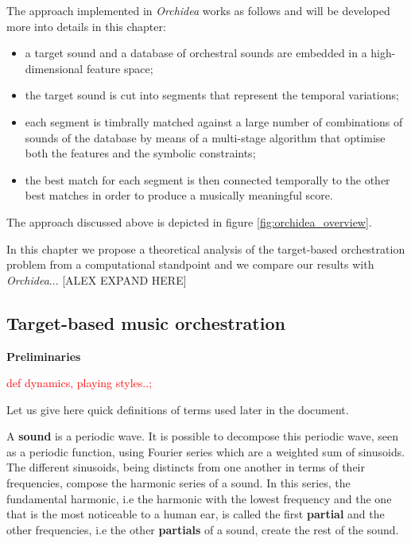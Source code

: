\documentclass[a4paper]{book}
\newcommand{\alex}[2]{\textcolor{red}{#1}}
\begin{document}
 







The approach implemented in \textit{Orchidea} works as follows and will be developed more into details in this chapter:
\begin{itemize}
	\item a target sound and a database of orchestral sounds are embedded in a high-dimensional feature space;
	\item the target sound is cut into segments that represent the temporal variations;
	\item each segment is timbrally matched against a large number of combinations of sounds of the database
	by means of a multi-stage algorithm that optimise both the features and the symbolic constraints;
	\item the best match for each segment is then connected temporally to the other best matches in order to produce a musically meaningful score.
\end{itemize}



The approach discussed above is depicted in figure \ref{fig:orchidea_overview}.

In this chapter we propose a theoretical analysis of the target-based orchestration problem from a computational standpoint and we compare our results with \textit{Orchidea}... [ALEX EXPAND HERE]

\subsection{Target-based music orchestration}
\textbf{Preliminaries}

\alex{def dynamics, playing styles..;}\\

Let us give here quick definitions of terms used later in the document. 

A \textbf{sound} is a periodic wave. It is possible to decompose this periodic wave, seen as a periodic function, using Fourier series which are a weighted sum of sinusoids.\\

The different sinusoids, being distincts from one another in terms of their frequencies, compose the harmonic series of a sound. In this series, the fundamental harmonic, i.e the harmonic with the lowest frequency and the one that is the most noticeable to a human ear, is called the first \textbf{partial} and the other frequencies, i.e the other \textbf{partials} of a sound, create the rest of the sound.\\
\end{document}
